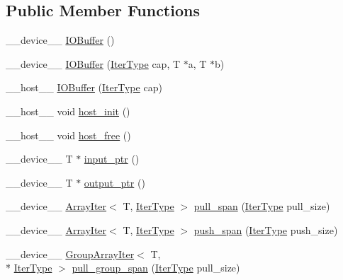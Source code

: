 \subsection*{Public Member Functions}
\begin{DoxyCompactItemize}
\item 
\-\_\-\-\_\-device\-\_\-\-\_\- \hyperlink{structIOBuffer_ad6e2ce28a80ed76835405972e2b288ad}{I\-O\-Buffer} ()
\item 
\-\_\-\-\_\-device\-\_\-\-\_\- \hyperlink{structIOBuffer_a72a56577b8e286889c9635a7065c6ff0}{I\-O\-Buffer} (\hyperlink{structIOBuffer_ab4571677106318f7fd246c9536292354}{Iter\-Type} cap, T $\ast$a, T $\ast$b)
\item 
\-\_\-\-\_\-host\-\_\-\-\_\- \hyperlink{structIOBuffer_a452e4d3aeafb929c34d1bc7a17f2a83f}{I\-O\-Buffer} (\hyperlink{structIOBuffer_ab4571677106318f7fd246c9536292354}{Iter\-Type} cap)
\item 
\-\_\-\-\_\-host\-\_\-\-\_\- void \hyperlink{structIOBuffer_ac5cf7047ac3632e9bd49628177c5fc26}{host\-\_\-init} ()
\item 
\-\_\-\-\_\-host\-\_\-\-\_\- void \hyperlink{structIOBuffer_adf7f2730843029e059fe74e12f8f6757}{host\-\_\-free} ()
\item 
\-\_\-\-\_\-device\-\_\-\-\_\- T $\ast$ \hyperlink{structIOBuffer_acb4cbf34f5e9a52f1dbe292d68ae7851}{input\-\_\-ptr} ()
\item 
\-\_\-\-\_\-device\-\_\-\-\_\- T $\ast$ \hyperlink{structIOBuffer_acfe37ec8792ee74282d550bcc1c44de7}{output\-\_\-ptr} ()
\item 
\-\_\-\-\_\-device\-\_\-\-\_\- \hyperlink{structArrayIter}{Array\-Iter}$<$ T, \hyperlink{structIOBuffer_ab4571677106318f7fd246c9536292354}{Iter\-Type} $>$ \hyperlink{structIOBuffer_aa553c6ffc098d25dc6b2643bd5ebd20e}{pull\-\_\-span} (\hyperlink{structIOBuffer_ab4571677106318f7fd246c9536292354}{Iter\-Type} pull\-\_\-size)
\item 
\-\_\-\-\_\-device\-\_\-\-\_\- \hyperlink{structArrayIter}{Array\-Iter}$<$ T, \hyperlink{structIOBuffer_ab4571677106318f7fd246c9536292354}{Iter\-Type} $>$ \hyperlink{structIOBuffer_a94066f72fe056544daa65fc2043332df}{push\-\_\-span} (\hyperlink{structIOBuffer_ab4571677106318f7fd246c9536292354}{Iter\-Type} push\-\_\-size)
\item 
\-\_\-\-\_\-device\-\_\-\-\_\- \hyperlink{structGroupArrayIter}{Group\-Array\-Iter}$<$ T, \\*
\hyperlink{structIOBuffer_ab4571677106318f7fd246c9536292354}{Iter\-Type} $>$ \hyperlink{structIOBuffer_a3c3b55ddd33b094eddfd0b889b8d666c}{pull\-\_\-group\-\_\-span} (\hyperlink{structIOBuffer_ab4571677106318f7fd246c9536292354}{Iter\-Type} pull\-\_\-size)

\end{DoxyCompactItemize}
